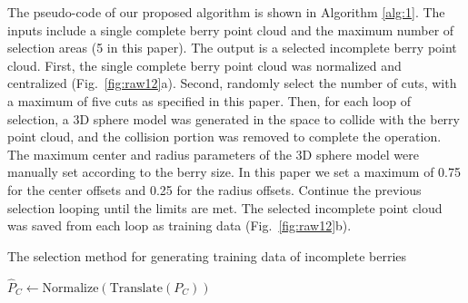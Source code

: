 \documentclass[12pt]{article}
\begin{document}
The pseudo-code of our proposed algorithm is shown in Algorithm \ref{alg:1}. 
The inputs include a single complete berry point cloud and the maximum number of selection areas (5 in this paper). 
The output is a selected incomplete berry point cloud. First, the single complete berry point cloud was normalized and centralized (Fig.~\ref{fig:raw12}a). 
Second, randomly select the number of cuts, with a maximum of five cuts as specified in this paper. 
Then, for each loop of selection, a 3D sphere model was generated in the space to collide with the berry point cloud, and the collision portion was removed to complete the operation. 
The maximum center and radius parameters of the 3D sphere model were manually set according to the berry size. 
In this paper we set a maximum of 0.75 for the center offsets and 0.25 for the radius offsets. 
Continue the previous selection looping until the limits are met. The selected incomplete point cloud was saved from each loop as training data (Fig.~\ref{fig:raw12}b). 

\begin{algorithm}
    \caption{The selection method for generating training data of incomplete berries}
    \label{alg:1}
    
    $\hat{P}_C \gets \text{Normalize}(\text{Translate}(P_C))$ 
\end{algorithm}
\end{document}
